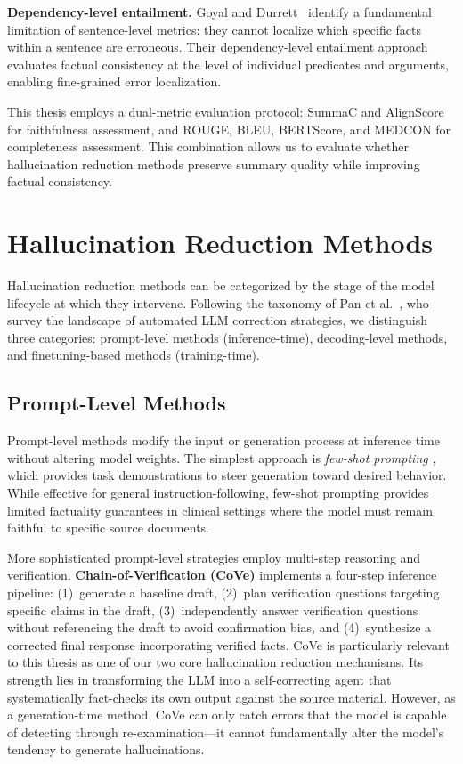 \documentclass[12pt,a4paper,oneside]{report}
\begin{document}
\textbf{Dependency-level entailment.} Goyal and Durrett~\cite{goyal2020evaluating} identify a fundamental limitation of sentence-level metrics: they cannot localize which specific facts within a sentence are erroneous. Their dependency-level entailment approach evaluates factual consistency at the level of individual predicates and arguments, enabling fine-grained error localization.

This thesis employs a dual-metric evaluation protocol: SummaC and AlignScore for faithfulness assessment, and ROUGE, BLEU, BERTScore, and MEDCON for completeness assessment. This combination allows us to evaluate whether hallucination reduction methods preserve summary quality while improving factual consistency.


\section{Hallucination Reduction Methods}
\label{sec:reduction-methods}

Hallucination reduction methods can be categorized by the stage of the model lifecycle at which they intervene. Following the taxonomy of Pan et al.~\cite{pan2024autocorrecting}, who survey the landscape of automated LLM correction strategies, we distinguish three categories: prompt-level methods (inference-time), decoding-level methods, and finetuning-based methods (training-time).

\subsection{Prompt-Level Methods}
\label{subsec:prompt-methods}

Prompt-level methods modify the input or generation process at inference time without altering model weights. The simplest approach is \textit{few-shot prompting} \cite{brown2020gpt3}, which provides task demonstrations to steer generation toward desired behavior. While effective for general instruction-following, few-shot prompting provides limited factuality guarantees in clinical settings where the model must remain faithful to specific source documents.

More sophisticated prompt-level strategies employ multi-step reasoning and verification. \textbf{Chain-of-Verification (CoVe)} \cite{dhuliawala2023cove} implements a four-step inference pipeline: (1)~generate a baseline draft, (2)~plan verification questions targeting specific claims in the draft, (3)~independently answer verification questions without referencing the draft to avoid confirmation bias, and (4)~synthesize a corrected final response incorporating verified facts. CoVe is particularly relevant to this thesis as one of our two core hallucination reduction mechanisms. Its strength lies in transforming the LLM into a self-correcting agent that systematically fact-checks its own output against the source material. However, as a generation-time method, CoVe can only catch errors that the model is capable of detecting through re-examination---it cannot fundamentally alter the model's tendency to generate hallucinations.
\end{document}
